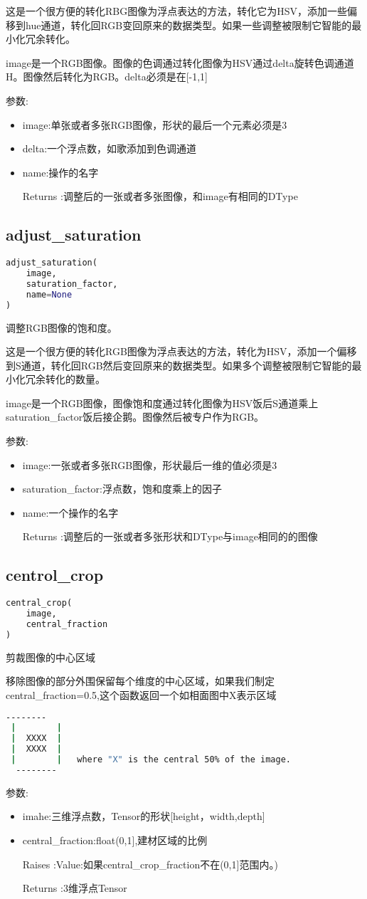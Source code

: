 {这是一个很方便的转化RBG图像为浮点表达的方法，转化它为HSV，添加一些偏移到hue通道，转化回RGB变回原来的数据类型。如果一些调整被限制它智能的最小化冗余转化。

image是一个RGB图像。图像的色调通过转化图像为HSV通过delta旋转色调通道H。图像然后转化为RGB。delta必须是在[-1,1]

参数:
\begin{itemize}
		\item image:单张或者多张RGB图像，形状的最后一个元素必须是3
		\item delta:一个浮点数，如歌添加到色调通道
		\item name:操作的名字
		\item[Returns]:调整后的一张或者多张图像，和image有相同的DType 
\end{itemize}
\subsection{adjust\_saturation}
\begin{lstlisting}[language=Python]
adjust_saturation(
    image,
    saturation_factor,
    name=None
)
\end{lstlisting}
调整RGB图像的饱和度。

这是一个很方便的转化RGB图像为浮点表达的方法，转化为HSV，添加一个偏移到S通道，转化回RGB然后变回原来的数据类型。如果多个调整被限制它智能的最小化冗余转化的数量。

image是一个RGB图像，图像饱和度通过转化图像为HSV饭后S通道乘上saturation\_factor饭后接企鹅。图像然后被专户作为RGB。

参数:
\begin{itemize}
		\item image:一张或者多张RGB图像，形状最后一维的值必须是3
		\item saturation\_factor:浮点数，饱和度乘上的因子
		\item name:一个操作的名字
		\item[Returns]:调整后的一张或者多张形状和DType与image相同的的图像
\end{itemize}
\subsection{centrol\_crop}
\begin{lstlisting}[language=Python]
central_crop(
    image,
    central_fraction
)
\end{lstlisting}
剪裁图像的中心区域

移除图像的部分外围保留每个维度的中心区域，如果我们制定central\_fraction=0.5,这个函数返回一个如相面图中X表示区域
\begin{lstlisting}[language=Bash]
 --------
 |        |
 |  XXXX  |
 |  XXXX  |
 |        |   where "X" is the central 50% of the image.
  --------
\end{lstlisting}
参数:
\begin{itemize}
	\item imahe:三维浮点数，Tensor的形状[height，width,depth]
	\item central\_fraction:float(0,1],建材区域的比例
	\item[Raises]:Value:如果central_crop_fraction不在(0,1]范围内。)
	\item[Returns]:3维浮点Tensor
\end{itemize}
}
